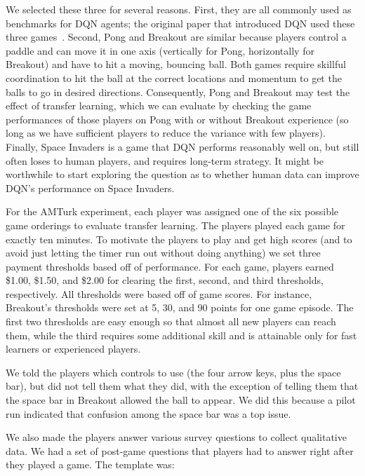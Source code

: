 \documentclass[letterpaper, 10 pt, conference]{ieeeconf}  %
\begin{document}
We selected these three for several reasons. First, they are all commonly used as benchmarks
for DQN agents; the original paper that introduced DQN used these three
games~\cite{mnih-atari-2013}. Second, Pong and Breakout are similar because players control a
paddle and can move it in one axis (vertically for Pong, horizontally for Breakout) and have to
hit a moving, bouncing ball. Both games require skillful coordination to hit the
ball at the correct locations and momentum to get the balls to go in desired directions.
Consequently, Pong and Breakout may test the effect of transfer learning, which we can evaluate by
checking the game performances of those players on Pong with or without Breakout experience (so long
as we have sufficient players to reduce the variance with few players). Finally, Space Invaders is a
game that DQN performs reasonably well on, but still often loses to human players, and requires
long-term strategy. It might be worthwhile to start exploring the question as to whether human data
can improve DQN's performance on Space Invaders.

For the AMTurk experiment, each player was assigned one of the six possible game orderings to 
evaluate transfer learning. The players played each game for exactly ten minutes. To motivate
the players to play and get high scores (and to avoid just letting the timer run out without doing
anything) we set three payment thresholds based off of performance. For each game, players earned
\$1.00, \$1.50, and \$2.00 for clearing the first, second, and third thresholds, respectively. All
thresholds were based off of game scores. For instance, Breakout's thresholds were set at 5, 30, and
90 points for one game episode. The first two thresholds are easy enough so that almost all new
players can reach them, while the third requires some additional skill and is attainable only for
fast learners or experienced players.

We told the players which controls to use (the four arrow keys, plus the space bar), but did not
tell them what they did, with the exception of telling them that the space bar in Breakout allowed
the ball to appear. We did this because a pilot run indicated that confusion among the space bar was
a top issue.

We also made the players answer various survey questions to collect qualitative data. We had a set
of post-game questions that players had to answer right after they played a game. The template was:
\end{document}
